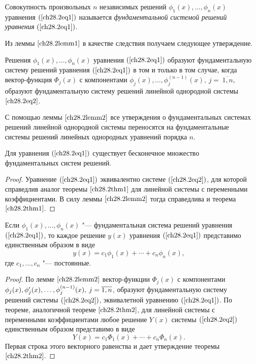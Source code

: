\begin{defn}
Совокупность произвольных $n$ независимых решений $\phi_1(x), \ldots, \phi_n(x)$ уравнения $(\ref{ch28.2eq1})$ называется \textit{фундаментальной системой решений уравнения} $(\ref{ch28.2eq1})$.
\end{defn}

Из леммы $\ref{ch28.2lemm1}$ в качестве следствия получаем следующее утверждение.

\begin{lemm} \label{ch28.2lemm2}
Решения $\phi_1(x), \ldots, \phi_n(x)$ уравнения $(\ref{ch28.2eq1})$ образуют фундаментальную систему решений уравнения $(\ref{ch28.2eq1})$ в том и только в том случае, когда вектор-функция $\Phi_j(x)$ с компонентами $\phi_j(x), \ldots, \phi^{(n - 1)}_j(x),\ j =\ \overline{1,n}$, образуют фундаментальную систему решений линейной однородной системы $\eqref{ch28.2eq2}$.
\end{lemm}

С помощью леммы $\ref{ch28.2lemm2}$ все утверждения о фундаментальных системах решений линейной однородной системы переносятся на фундаментальные системы решений линейных однородных уравнений порядка $n$.

\begin{thm} \label{ch28.2thm1}
Для уравнения $(\ref{ch28.2eq1})$ существует бесконечное множество фундаментальных систем решений.
\end{thm}

\begin{proof}
Уравнение $(\ref{ch28.2eq1})$ эквивалентно системе $(\ref{ch28.2eq2})$, для которой справедлив аналог теоремы $\ref{ch28.2thm1}$ для линейной системы с переменными коэффициентами. В силу леммы $\ref{ch28.2lemm2}$ тогда справедлива и теорема $\ref{ch28.2thm1}$.
\end{proof}

\begin{thm} \label{ch28.2thm2}
Если $\phi_1(x), \ldots, \phi_n(x)$ "--- фундаментальная система решений уравнения $(\ref{ch28.2eq1})$, то каждое решение $y(x)$ уравнения $(\ref{ch28.2eq1})$ представимо единственным образом в виде
$$
y(x) = c_1\phi_1(x) + \cdots + c_n\phi_n(x),
$$
где $c_1, \ldots, c_n$ "--- постоянные.
\end{thm}

\begin{proof}
По лемме $\ref{ch28.2lemm2}$ вектор-функции $\Phi_j(x)$ с компонентами $\phi_j(x),\\ \phi'_j(x), \ldots, \phi^{(n - 1)}_j(x), \: j = \overline{1,n}$, образуют фундаментальную систему решений системы $(\ref{ch28.2eq2})$, эквивалетной уравнению $(\ref{ch28.2eq1})$. По теореме, аналогичной теореме $\ref{ch28.2thm2}$, для линейной системы с переменными коэффициентами любое решение $Y(x)$ системы $(\ref{ch28.2eq2})$ единственным образом представимо в виде
$$
Y(x) = c_1 \Phi_1(x) + \cdots + c_n \Phi_n(x).
$$
Первая строка этого векторного равенства и дает утверждение теоремы $\ref{ch28.2thm2}$.
\end{proof}

